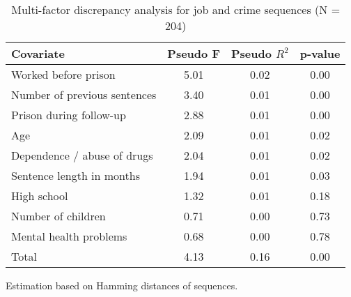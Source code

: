 \begin{table}[htp]
\footnotesize
\setlength{\tabcolsep}{10pt}
\renewcommand{\arraystretch}{1.3}
\begin{threeparttable}
\centering
\caption{Multi-factor discrepancy analysis for job and crime sequences (N = 204)} 
\label{tab:discrepancy_crime_job}
\begin{tabular}{lccc}
  \hline
Covariate & Pseudo F & Pseudo $R^2$ & p-value \\ 
  \hline
Worked before prison & 5.01 & 0.02 & 0.00 \\ 
  Number of previous sentences & 3.40 & 0.01 & 0.00 \\ 
  Prison during follow-up & 2.88 & 0.01 & 0.00 \\ 
  Age & 2.09 & 0.01 & 0.02 \\ 
  Dependence / abuse of drugs & 2.04 & 0.01 & 0.02 \\ 
  Sentence length in months & 1.94 & 0.01 & 0.03 \\ 
  High school & 1.32 & 0.01 & 0.18 \\ 
  Number of children & 0.71 & 0.00 & 0.73 \\ 
  Mental health problems & 0.68 & 0.00 & 0.78 \\ 
  Total & 4.13 & 0.16 & 0.00 \\ 
   \hline
\end{tabular}
\begin{tablenotes}
\scriptsize
\item Estimation based on Hamming distances of sequences.
\end{tablenotes}
\end{threeparttable}
\end{table}
